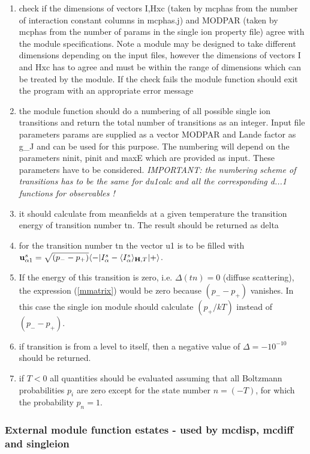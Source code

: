 \begin{enumerate}
\item check if the dimensions of vectors I,Hxc (taken by {\prg mcphas} from the number of 
interaction constant columns in {\prg mcphas.j})
 and MODPAR (taken by {\prg mcphas} from the number of params in the single ion property
file) agree with the module specifications. Note a module may be designed to 
take different dimensions depending on the input files, however the dimensions
of vectors I and Hxc has to agree and must be within the range of dimensions which
can be treated by the module. If the check fails the module function should exit the
program with an appropriate error message
\item the module function should do a numbering of all possible single ion transitions and return
the total number of transitions as an integer. Input file parameters params are supplied as a vector MODPAR and
Lande factor as g\_J and  can be used for this purpose. The numbering will depend on
the parameters ninit, pinit and maxE which are provided as input. These parameters
have to be considered. {\em IMPORTANT: the numbering scheme of transitions has to
be the same for du1calc and all the corresponding d...1 functions for observables !}
\item it should calculate from meanfields at a given temperature the 
transition energy of transition number {\prg tn}. The result should be returned as {\prg delta}
\item for the transition number tn the vector u1 is to
 be filled with 
${\mathbf u^s_{\alpha1}}=\sqrt{(p_--p_+)}\langle -|I^s_{\alpha}-\langle I^s_{\alpha}\rangle_{\mathbf H,T}|+\rangle$.
\item
If the energy of this transition
is zero, i.e. $\Delta(tn)=0$ (diffuse scattering), 
the expression (\ref{mmatrix}) would be zero because $(p_--p_+)$ vanishes.
In this case the single ion module should calculate $(p_+/kT)$ instead of $(p_--p_+)$.
\item if transition is from a level to itself, then a negative 
value of $\Delta=-10^{-10}$ should be returned.
\item if $T<0$ all quantities should be evaluated assuming that all Boltzmann probabilities $p_i$
 are zero except for the state number $n=(-T)$, for which the probability $p_n=1$.
\end{enumerate}

\subsubsection{External module function {\prg estates} - used by {\prg mcdisp},
 {\prg %
mcdiff} and {\prg singleion}}

